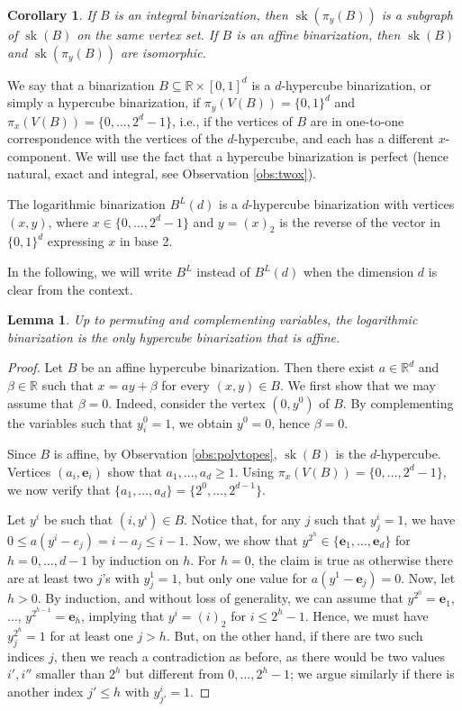 \documentclass[11pt,a4paper]{article}
\newtheorem{lemma}[theorem]{Lemma}
\newtheorem{corollary}[theorem]{Corollary}
\newcommand{\R}{\mathbb{R}}
\newcommand{\1}{\textbf{1}}
\newcommand{\sk}{\operatorname{sk}}
\begin{document}
\begin{corollary}\label{cor:subgraph}
If $B$ is an integral binarization, then $\sk(\pi_y(B))$  is a subgraph of $\sk(B)$ on the same vertex set. If $B$ is an affine binarization, then  $\sk(B)$ and $\sk(\pi_y(B))$  are isomorphic.  
\end{corollary}


We say that a binarization $B\subseteq \R\times [0,1]^d$ is a $d$-hypercube binarization, or simply a hypercube binarization, if $\pi_y(V(B))=\{0,1\}^d$ and $\pi_x(V(B))=\{0,\dots,2^d-1\}$, i.e., if the vertices of $B$ are in one-to-one correspondence with the vertices of the $d$-hypercube, and each has a different $x$-component. We will use the fact that a hypercube binarization is perfect (hence natural, exact and integral, see Observation \ref{obs:twox}).

The logarithmic binarization $B^L(d)$ is a $d$-hypercube binarization with vertices $(x, y)$, where $x\in\{0,\dots,2^d-1\}$ and $y=(x)_2$ is the reverse of the vector in $\{0,1\}^d$ expressing $x$ in base 2. 

In the following, we will write $B^L$ instead of $B^L(d)$ when the dimension $d$ is clear from the context.




\begin{lemma}\label{le:onlyaffine}
Up to permuting and complementing variables, the logarithmic binarization  is the only hypercube binarization that is affine.
\end{lemma}


\begin{proof}
Let $B$ be an affine hypercube binarization. Then there exist $a\in\R^d$ and $\beta\in\R$ such that $x=ay+\beta$ for every $(x,y)\in B$. We first show that we may assume that $\beta=0$. Indeed, consider the vertex $(0,y^0)$ of $B$. By complementing the variables such that $y^0_i=1$, we obtain $y^0=0$, hence $\beta=0$. 

Since $B$ is affine, by Observation \ref{obs:polytopes}, $\sk(B)$ is the $d$-hypercube. Vertices $(a_i,\mathbf{e}_i)$ show that $a_1,\dots,a_d \ge1$. Using  $\pi_x(V(B))=\{0,\dots,2^d-1\}$, we now verify that  $\{a_1,\dots,a_d\}=\{2^0,\dots,2^{d-1}\}$.

Let $y^i$ be such that $(i,y^i)\in B$. Notice that, for any $j$ such that $y^i_j=1$, we have $0\leq a(y^i-e_j)=i-a_j\le i-1$. Now, we show that $y^{2^h}\in \{\mathbf{e}_1,\dots, \mathbf{e}_d\}$ for $h=0,\dots, d-1$ by induction on $h$. For $h=0$, the claim is true as otherwise there are at least two $j$'s with $y^1_j=1$, but only one value for $a(y^1-\mathbf{e}_j)=0$. Now, let $h>0$. By induction, and without loss of generality, we can assume that $y^{2^0}=\mathbf{e}_1$, $\dots$, $y^{2^{h-1}}=\mathbf{e}_{h}$,  implying that $y^i=(i)_2$ for $i\leq 2^{h}-1$. Hence, we must have $y^{2^h}_j=1$  for at least one $j>h$. But, on the other hand, if there are two such indices $j$,  then we reach a contradiction as before, as there would be two values $i', i''$ smaller than $2^h$ but different from $0,\dots, 2^h-1$; we argue similarly if there is another index $j'\leq h$  with $y^i_{j'}=1$.
\end{proof}
\end{document}
